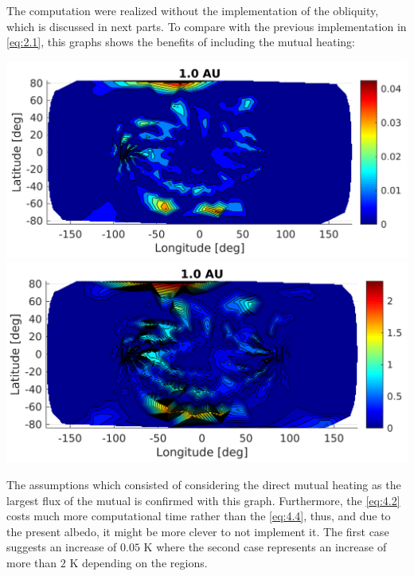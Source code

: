 The computation were realized without the implementation of the obliquity, which is discussed in next parts. To compare with the previous implementation in \autoref{eq:2.1}, this graphs shows the benefits of including the mutual heating:
\begin{center}
    \includegraphics[width=\linewidth]{rsc/mutual_W.png}
    \includegraphics[width=\linewidth]{rsc/mutual_Wu.png}
    \label{fig:4.4}
\end{center}
The assumptions which consisted of considering the direct mutual heating as the largest flux of the mutual is confirmed with this graph. Furthermore, the \autoref{eq:4.2} costs much more computational time rather than the \autoref{eq:4.4}, thus, and due to the present albedo, it might be more clever to not implement it. The first case suggests an increase of $0.05$ \si{\kelvin} where the second case represents an increase of more than $2$ \si{\kelvin} depending on the regions.

